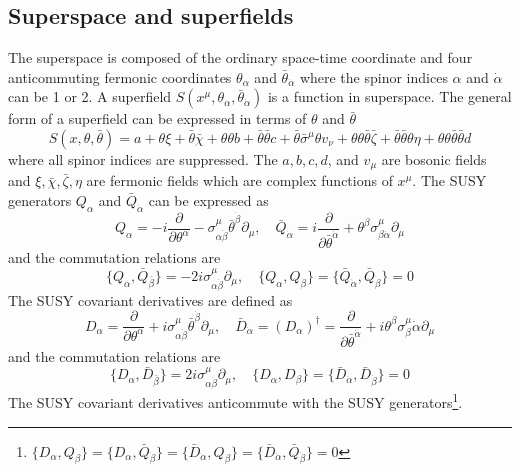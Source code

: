 \subsection{Superspace and superfields}
\label{subsec:susy_superspace_and_superfields}
The superspace is composed of the ordinary space-time coordinate and four anticommuting fermonic coordinates $\theta_{\alpha}$ and $\bar{\theta}_{\dot{\alpha}}$ where the spinor indices $\alpha$ and $\dot{\alpha}$ can be 1 or 2. 
A superfield $S(x^{\mu}, \theta_{\alpha}, \bar{\theta}_{\dot{\alpha}})$ is a function in superspace.
The general form of a superfield can be expressed in terms of $\theta$ and $\bar{\theta}$
%
\begin{equation}
S(x, \theta, \bar{\theta}) = a + \theta \xi + \bar{\theta} \bar{\chi} + \theta \theta b + \bar{\theta}\bar{\theta}c + \bar{\theta}\bar{\sigma}^{\mu}\theta v_{\nu} + \theta \theta \bar{\theta} \bar{\zeta} + \bar{\theta} \bar{\theta} \theta \eta + \theta \theta \bar{\theta} \bar{\theta} d
\label{eq:susy_superfield}
\end{equation}
%
where all spinor indices are suppressed.
The $a, b, c, d$, and $v_{\mu}$ are bosonic fields and $\xi, \bar{\chi}, \bar{\zeta}, \eta$ are fermonic fields which are complex functions of $x^{\mu}$.
The SUSY generators $Q_{\alpha}$ and $\bar{Q}_{\dot{\alpha}}$ can be expressed as
%
\begin{equation}
Q_{\alpha} = -i \frac{\partial}{\partial \theta^{\alpha}} - \sigma^{\mu}_{\alpha \dot{\beta}} \bar{\theta}^{\dot{\beta}} \partial_{\mu}, \quad
\bar{Q}_{\dot{\alpha}} = i \frac{\partial}{\partial \bar{\theta}^{\dot{\alpha}}} + \theta^{\beta} \sigma^{\mu}_{\beta \dot{\alpha}} \partial_{\mu}
\label{eq:susy_susy_generators}
\end{equation}
%
and the commutation relations are
%
\begin{equation}
\{Q_{\alpha}, \bar{Q}_{\bar{\beta}}\} = -2i \sigma^{\mu}_{\alpha \dot{\beta}} \partial_{\mu}, \quad
\{Q_{\alpha}, Q_{\beta}\} = \{\bar{Q}_{\dot{\alpha}}, \bar{Q}_{\dot{\beta}}\} = 0
\label{eq:susy_susy_generator_commutation_relations}
\end{equation}
%
The SUSY covariant derivatives are defined as
%
\begin{equation}
D_{\alpha} = \frac{\partial}{\partial \theta^{\alpha}} + i \sigma^{\mu}_{\alpha \dot{\beta}} \bar{\theta}^{\dot{\beta}} \partial_{\mu}, \quad
\bar{D}_{\dot{\alpha}} = (D_{\alpha})^{\dagger} = \frac{\partial}{\partial \bar{\theta}^{\dot{\alpha}}} + i \theta^{\beta} \sigma^{\mu}_{\beta}{\dot{\alpha}} \partial_{\mu}
\label{eq:susy_susy_covariant_derivatives}
\end{equation}
%
and the commutation relations are
%
\begin{equation}
\{D_{\alpha}, \bar{D}_{\bar{\beta}}\} = 2i \sigma^{\mu}_{\alpha \dot{\beta}} \partial_{\mu}, \quad
\{D_{\alpha}, D_{\beta}\} = \{\bar{D}_{\dot{\alpha}}, \bar{D}_{\dot{\beta}}\} = 0
\label{eq:susy_susy_covariant_derivatives_commutation_relations}
\end{equation}
%
The SUSY covariant derivatives anticommute with the SUSY generators\footnote{$\{D_{\alpha}, Q_{\beta}\} = \{D_{\alpha}, \bar{Q}_{\dot{\beta}}\}= \{\bar{D}_{\dot{\alpha}}, Q_{\beta}\} = \{\bar{D}_{\dot{\alpha}}, \bar{Q}_{\dot{\beta}}\} =0$}.


